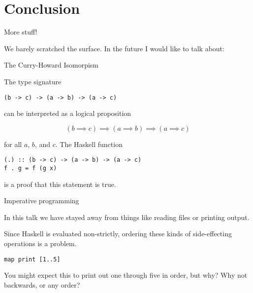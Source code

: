 
\section{Conclusion}

%
\begin{frame}{More stuff!}

We barely scratched the surface. In the future I would like to talk about:

\end{frame}

%
\begin{frame}[fragile]{The Curry-Howard Isomorpism}

The type signature

\begin{block}{}
\begin{verbatim}
(b -> c) -> (a -> b) -> (a -> c)
\end{verbatim}
\end{block}

can be interpreted as a logical proposition

\begin{block}{}
\[
(b \implies c) \implies (a \implies b) \implies (a \implies c)
\]
\end{block}

for all $a$, $b$, and $c$. The Haskell function

\begin{block}{}
\begin{verbatim}
(.) :: (b -> c) -> (a -> b) -> (a -> c)
f . g = f (g x)
\end{verbatim}
\end{block}

is a proof that this statement is true.

\end{frame}

%
\begin{frame}[fragile]{Imperative programming}

In this talk we have stayed away from things like reading files or printing
output.

Since Haskell is evaluated non-strictly, ordering these kinds of side-effecting
operations is a problem.

\begin{block}{}
\begin{verbatim}
map print [1..5]
\end{verbatim}
\end{block}

You might expect this to print out one through five in order, but why? Why not
backwards, or any order?

\end{frame}

